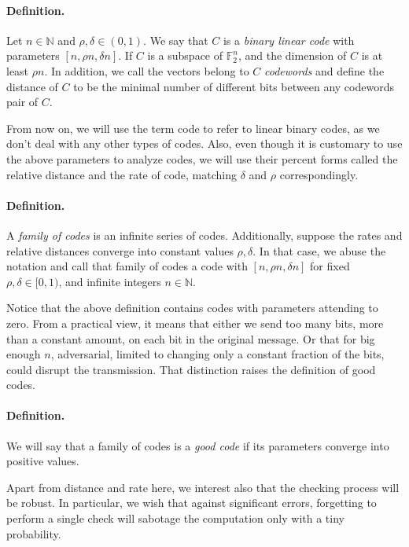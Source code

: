 \documentclass{article}
\begin{document}
\begin{multicols*}{2}
  \paragraph{Definition.} Let $n \in \mathbb{N}$ and $\rho, \delta\in \left( 0,1 \right)$. We say that $C$ is a \textit{binary linear code} with parameters $[n, \rho n, \delta n]$. If $C$ is a subspace of $\mathbb{F}_{2}^{n}$, and the dimension of $C$ is at least $\rho n$. In addition, we call the vectors belong to $C$ \textit{codewords} and define the distance of $C$ to be the minimal number of different bits between any codewords pair of $C$.   

  From now on, we will use the term code to refer to linear binary codes, as we don't deal with any other types of codes. Also, even though it is customary to use the above parameters to analyze codes, we will use their percent forms called the relative distance and the rate of code, matching $\delta$ and $\rho$ correspondingly.     
  \paragraph{Definition.} A \textit{family of codes} is an infinite series of codes. Additionally, suppose the rates and relative distances converge into constant values $\rho,\delta$. In that case, we abuse the notation and call that family of codes a code with $[n, \rho n, \delta n]$ for fixed $\rho, \delta\in [ 0,1 )$, and infinite integers $n \in \mathbb{N}$.     

  Notice that the above definition contains codes with parameters attending to zero. From a practical view, it means that either we send too many bits, more than a constant amount, on each bit in the original message. Or that for big enough $n$, adversarial, limited to changing only a constant fraction of the bits, could disrupt the transmission. That distinction raises the definition of good codes.

  \paragraph{Definition.}We will say that a family of codes is a \textit{good code} if its parameters converge into positive values. 

  Apart from distance and rate here, we interest also that the checking process will be robust. In particular,  we wish that against significant errors, forgetting to perform a single check will sabotage the computation only with a tiny probability.  

\end{multicols*}
\end{document}
